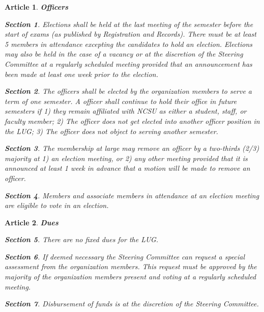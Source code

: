 \documentclass [letterpaper, 12pt]{article}
\newtheorem{art}{Article}
\newtheorem{sect}{Section}[art]
\begin{document}
\begin{art} {\bf Officers}
\begin{sect}
Elections shall be held at the last meeting of the semester before the
start of exams (as published by Registration and Records).  There must be
at least 5 members in attendance excepting the candidates to hold an election.
Elections may also be held in the case of a vacancy or at the discretion of the
Steering Committee at a regularly scheduled meeting provided that an
announcement has been made at least one week prior to the election.
\end{sect}
\begin{sect}
The officers shall be elected by the organization members to serve a term of one
semester.  A officer shall continue to hold their office in future semesters
if 1) they remain affiliated with NCSU as either a student, staff, or faculty
member; 2) The officer does not get elected
into another officer position in the LUG; 3) The officer does not object
to serving another semester.
\end{sect}
\begin{sect}
The membership at large may remove an officer by a two-thirds (2/3) majority at 1) an election meeting, or 2) any other meeting provided that it is announced at least 1 week in advance that a motion will be made to remove an officer.
\end{sect}
\begin{sect}
Members and associate members in attendance at an election meeting are eligible to vote in an election.
\end{sect}

\end{art}

\bigskip
\begin{art} {\bf Dues}
\label{art-dues}

\begin{sect}
There are no fixed dues for the LUG.
\end{sect}

\begin{sect}
If deemed necessary the Steering Committee can request a special assessment
from the organization members.  This request must be approved by the majority of
the organization members present and voting at a regularly scheduled meeting.
\end{sect}

\begin{sect}
Disbursement of funds is at the discretion of the Steering Committee.
\end{sect}

\end{art}
\end{document}
